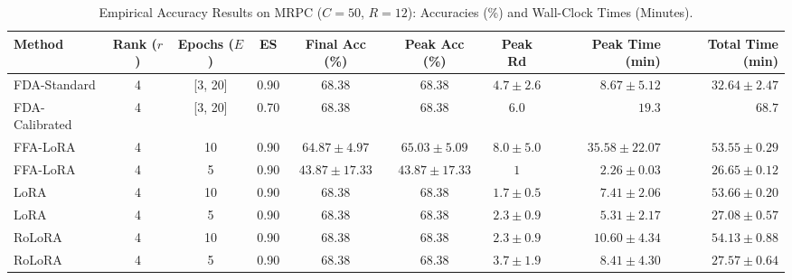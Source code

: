 \documentclass[10pt,a4paper]{article}
\begin{document}
\begin{table}[H]
\centering
\caption{Empirical Accuracy Results on MRPC ($C=50$, $R=12$): Accuracies (\%) and Wall-Clock Times (Minutes).}
\scriptsize
\setlength{\tabcolsep}{3.5pt}
\begin{tabular*}{\textwidth}{@{\extracolsep{\fill}}lccccccrr@{}}
\toprule
\textbf{Method} & \textbf{Rank ($r$)} & \textbf{Epochs ($E$)} & \textbf{ES} & \textbf{Final Acc (\%)} & \textbf{Peak Acc (\%)} & \textbf{Peak Rd} & \textbf{Peak Time (min)} & \textbf{Total Time (min)} \\
\midrule
FDA-Standard & 4 & [3, 20] & 0.90 & $\mathbf{68.38}$ & $\mathbf{68.38}$ & $4.7 \pm 2.6$ & $8.67 \pm 5.12$ & $32.64 \pm 2.47$ \\
FDA-Calibrated & 4 & [3, 20] & 0.70 & $\mathbf{68.38}$ & $\mathbf{68.38}$ & $6.0$ & $19.3$ & $68.7$ \\
FFA-LoRA & 4 & 10 & 0.90 & $64.87 \pm 4.97$ & $65.03 \pm 5.09$ & $8.0 \pm 5.0$ & $35.58 \pm 22.07$ & $53.55 \pm 0.29$ \\
FFA-LoRA & 4 & 5 & 0.90 & $43.87 \pm 17.33$ & $43.87 \pm 17.33$ & $1$ & $\mathbf{2.26 \pm 0.03}$ & $26.65 \pm 0.12$ \\
LoRA & 4 & 10 & 0.90 & $\mathbf{68.38}$ & $\mathbf{68.38}$ & $1.7 \pm 0.5$ & $7.41 \pm 2.06$ & $53.66 \pm 0.20$ \\
LoRA & 4 & 5 & 0.90 & $\mathbf{68.38}$ & $\mathbf{68.38}$ & $2.3 \pm 0.9$ & $5.31 \pm 2.17$ & $27.08 \pm 0.57$ \\
RoLoRA & 4 & 10 & 0.90 & $\mathbf{68.38}$ & $\mathbf{68.38}$ & $2.3 \pm 0.9$ & $10.60 \pm 4.34$ & $54.13 \pm 0.88$ \\
RoLoRA & 4 & 5 & 0.90 & $\mathbf{68.38}$ & $\mathbf{68.38}$ & $3.7 \pm 1.9$ & $8.41 \pm 4.30$ & $27.57 \pm 0.64$ \\
\bottomrule
\end{tabular*}
\end{table}
\end{document}
